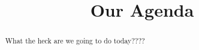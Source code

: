 \documentclass{ximera}
\title{Our Agenda}
\begin{document}
\begin{abstract}
What the heck are we going to do today????
\end{abstract}
\maketitle
\end{document}
